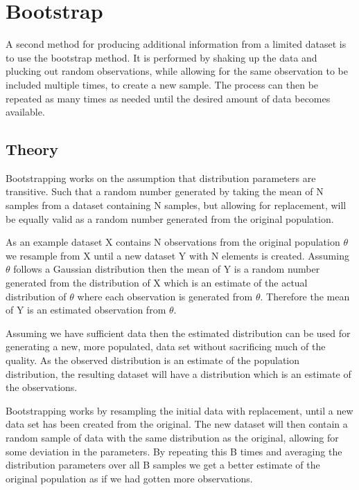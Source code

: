 \section{Bootstrap}\label{ch:bootstrap}

A second method for producing additional information from a limited dataset is to use the bootstrap method. It is performed by shaking up the data and plucking out random observations, while allowing for the same observation to be included multiple times, to create a new sample. The process can then be repeated as many times as needed until the desired amount of data becomes available. 

\subsection{Theory}

Bootstrapping works on the assumption that distribution parameters are transitive. Such that a random number generated by taking the mean of N samples from a dataset containing N samples, but allowing for replacement, will be equally valid as a random number generated from the original population.

As an example dataset X contains N observations from the original population $\theta$ we resample from X until a new dataset Y with N elements is created. Assuming $\theta$ follows a Gaussian distribution then the mean of Y is a random number generated from the distribution of X which is an estimate of the actual distribution of $\theta$ where each observation is generated from $\theta$. Therefore the mean of Y is an estimated observation from $\theta$.

Assuming we have sufficient data then the estimated distribution can be used for generating a new, more populated, data set without sacrificing much of the quality. As the observed distribution is an estimate of the population distribution, the resulting dataset will have a distribution which is an estimate of the observations.

\iffalse %
Bootstrapping works by resampling the initial data with replacement, until a new data set has been created from the original. The new dataset will then contain a random sample of data with the same distribution as the original, allowing for some deviation in the parameters. By repeating this B times and averaging the distribution parameters over all B samples we get a better estimate of the original population as if we had gotten more observations.

